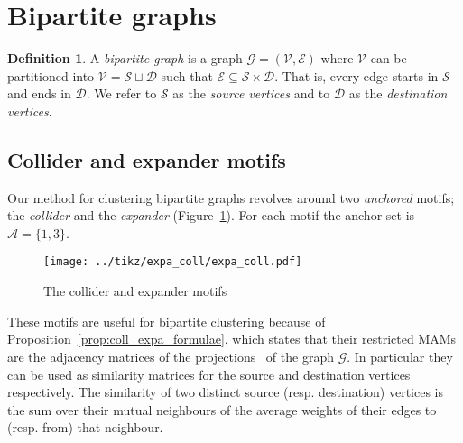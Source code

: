 \documentclass[12pt]{ociamthesis}
\theoremstyle{plain}
\theoremstyle{definition}
\newtheorem{definition}{Definition}[chapter]
\theoremstyle{remark}
\newcommand\ca[1]{\mathcal{#1}}
\begin{document}
\section{Bipartite graphs} \label{sec:bipartite_graphs}

\begin{definition}
A \emph{bipartite graph} is a graph $\ca{G}=(\ca{V,E})$ where $\ca{V}$ can be
partitioned into $\ca{V} = \ca{S} \sqcup \ca{D}$ such that $\ca{E} \subseteq
\ca{S} \times \ca{D}$. That is, every edge starts in $\ca{S}$ and ends in
$\ca{D}$. We refer to $\ca{S}$ as the \emph{source vertices} and to $\ca{D}$
as the \emph{destination vertices}.
\end{definition}

\subsection{Collider and expander motifs} \label{sec:coll_expa}

Our method for clustering bipartite graphs revolves around two \emph{anchored}
motifs; the \emph{collider} and the \emph{expander}
(Figure~\ref{fig:expa_coll}). For each motif the anchor set is $\ca{A}=\{ 1,3
\}$.

\begin{figure}[H]
\centering
\texttt{[image: ../tikz/expa\_coll/expa\_coll.pdf]}
\caption{The collider and expander motifs}
\label{fig:expa_coll}
\end{figure}

These motifs are useful for bipartite clustering because of
Proposition~\ref{prop:coll_expa_formulae}, which states that their restricted
MAMs are the adjacency matrices of the
projections~\cite{kolaczyk2014statistical} of the graph $\ca{G}$.
In particular they can be used as similarity matrices for the source and
destination vertices respectively.
The similarity of two distinct source (resp. destination) vertices is the sum
over their mutual neighbours of the average weights of their edges to (resp.
from) that neighbour.
\end{document}
